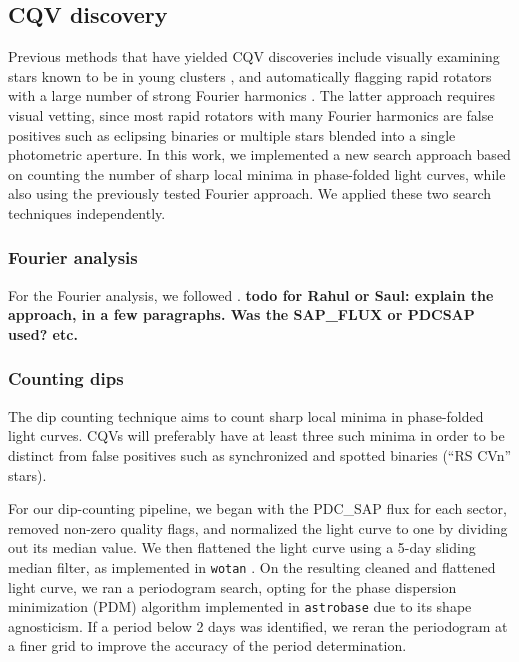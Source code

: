 \documentclass[11pt,twocolumn,tighten]{aastex63}
\begin{document}
\subsection{CQV discovery}
\label{subsec:discoverymethods}

Previous methods that have yielded CQV discoveries include visually
examining stars known to be in young clusters
\citep{2017AJ....153..152S}, and automatically flagging rapid rotators
with a large number of strong Fourier harmonics
\citep{2019ApJ...876..127Z}.  The latter approach requires visual
vetting, since most rapid rotators with many Fourier harmonics are
false positives such as eclipsing binaries or multiple stars blended
into a single photometric aperture.  In this work, we implemented a
new search approach based on counting the number of sharp local minima
in phase-folded light curves, while also using the previously tested
Fourier approach.  We applied these two search techniques
independently.   


\subsubsection{Fourier analysis}
\label{subsec:fourier}
For the Fourier analysis, we followed
\citet{2019ApJ...876..127Z}.
{\bf todo for Rahul or Saul: explain the approach, in a few
paragraphs.  Was the SAP\_FLUX or PDCSAP used? etc. }


\subsubsection{Counting dips}
\label{subsec:counting}

The dip counting technique aims to count sharp local minima in
phase-folded light curves.  CQVs will preferably have at least three
such minima in order to be distinct from false positives such as
synchronized and spotted binaries (``RS CVn'' stars). 

For our dip-counting pipeline, we began with the PDC\_SAP flux for
each sector, removed non-zero quality flags, and normalized the light
curve to one by dividing out its median value.  We then flattened the
light curve using a 5-day sliding median filter, as implemented in
\texttt{wotan} \citep{2019AJ....158..143H}.  On the resulting cleaned
and flattened light curve, we ran a periodogram search, opting for the
\citet{1978ApJ...224..953S} phase dispersion minimization (PDM)
algorithm implemented in \texttt{astrobase}
\citep{2021zndo...1011188B} due to its shape agnosticism.  If a period
below 2 days was identified, we reran the periodogram at a finer grid
to improve the accuracy of the period determination.
\end{document}
